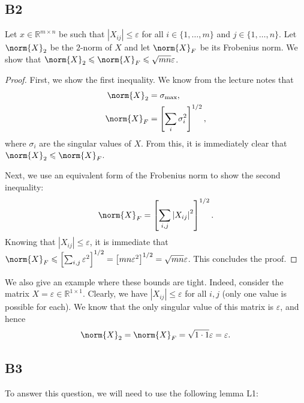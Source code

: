 \documentclass[11pt]{article}
\newcommand{\abs}[1]{\left\lvert#1\right\lvert}
\newcommand{\real}{\mathbb{R}} %
\newcommand{\snorm}[1]{\norm{#1}_2} %
\newcommand{\fnorm}[1]{\norm{#1}_F} %
\begin{document}
\subsection*{B2}
Let \(x \in \real^{m \times n}\) be such that \(\abs{X_{ij}} \leqslant \varepsilon\) for all \(i \in \{1, \dots, m\}\) and \(j \in \{1, \dots, n\}\).
Let \(\snorm{X}\) be the \(2\)-norm of \(X\) and let \(\fnorm{X}\) be its Frobenius norm.
We show that \(\snorm{X} \leqslant \fnorm{X} \leqslant \sqrt{mn} \varepsilon\).
\begin{proof}
	First, we show the first inequality.
	We know from the lecture notes that
	\begin{align*}
	\snorm{X} &= \sigma_{\textnormal{max}},\\
	\fnorm{X} &= \left[\sum_i \sigma_i^2\right]^{1/2},
	\end{align*}
	where \(\sigma_i\) are the singular values of \(X\).
	From this, it is immediately clear that \(\snorm{X} \leqslant \fnorm{X}\).
	
	Next, we use an equivalent form of the Frobenius norm to show the second inequality:
	\[
	\fnorm{X} = \left[\sum_{i, j} \abs{X_{ij}}^2 \right]^{1/2}.
	\]
	Knowing that \(\abs{X_{ij}} \leqslant \varepsilon\), it is immediate that \(\fnorm{X} \leqslant \left[\sum_{i, j} \varepsilon^2\right]^{1/2} = \left[mn \varepsilon^2\right]^{1/2} = \sqrt{mn} \varepsilon\).
	This concludes the proof.
\end{proof}

We also give an example where these bounds are tight.
Indeed, consider the matrix \(X = \varepsilon \in \real^{1 \times 1}\).
Clearly, we have \(\abs{X_{ij}} \leqslant \varepsilon \) for all \(i, j\) (only one value is possible for each).
We know that the only singular value of this matrix is \(\varepsilon\), and hence
\[
\snorm{X} = \fnorm{X} = \sqrt{1 \cdot 1} \varepsilon = \varepsilon.
\]
\subsection*{B3}
To answer this question, we will need to use the following lemma L1: 
\end{document}
